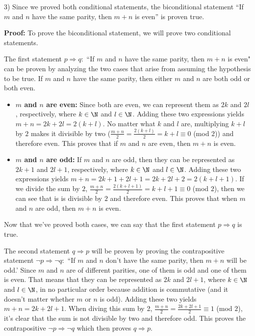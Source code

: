 \begin{paragraph}{3)}
		\leftIndent Since we proved both conditional statements, the 
		biconditional statement ``If $m$ and $n$ have the same parity,
		then $m + n$ is even'' is proven true. \spacing

		\textbf{Proof:} To prove the biconditional statement, we will prove two conditional statements.\spacing

		\leftIndent The first statement $p \Rightarrow q:$ ``If $m$ and $n$ have the same parity, then $m + n$ is even"
		can be proven by analyzing the two cases that arise from assuming the hypothesis to be true. 
		If $m$ and $n$ have the same parity, then either $m$ and $n$ are both odd or both even. \

		\begin{itemize}
			\item{
				\textbf{$\mathbf{\textit{m}}$ and $\mathbf{\textit{n}}$ are even:} Since both are even, we can represent them as 
				$2k$ and $2l$, respectively, where $k \in \N$ and $l \in \N$. Adding these two
				expressions yields $m + n = 2k + 2l = 2(k+l)$. No matter what $k$ and $l$ are, 
				multiplying $k + l$ by $2$ makes it divisible by two 
				($\frac{m + n}{2} = \frac{2(k + l)}{2} = k + l \equiv 0$ (mod $2$)) and therefore even. 
				This proves that if $m$ and $n$ are even, then $m + n$ is even.
			}
		
			\item{
				\textbf{$\mathbf{\textit{m}}$ and $\mathbf{\textit{n}}$ are odd:} If $m$ and
				$n$ are odd, then they can be represented as $2k + 1$ and $2l + 1$, respectively,
				where $k \in \N$ and $l \in \N$. Adding these two expressions yields 
				$m + n = 2k + 1 + 2l + 1 = 2k + 2l + 2 = 2(k + l + 1)$. If we divide the sum by $2$,
				$\frac{m + n}{2} = \frac{2(k + l + 1)}{2} = k + l + 1 \equiv 0$ (mod $2$), then we can see that is is divisible
				by $2$ and therefore even. This proves that when  $m$ and $n$ are odd, then $m + n$ is even.
			}
		\end{itemize}

		\begin{flushleft}
			Now that we've proved both cases, we can say that the first statement $p \Rightarrow q$ is true.
		\end{flushleft}

		\leftIndent The second statement $q \Rightarrow p$ will be proven by proving the contrapositive statement
		$\neg p \Rightarrow \neg q:$ ``If $m$ and $n$ don't have the same parity, then $m + n$ will be odd.'
		Since $m$ and $n$ are of different parities, one of them is odd and one of them is even. That means that 
		they can be represented as $2k$ and $2l + 1$, where $k \in \N$ and $l \in \N$, in no particular order because 
		addition is commutative (and it doesn't matter whether $m$ or $n$ is odd). Adding these two yields
		$m + n = 2k + 2l + 1$. When diving this sum by 2, $\frac{m + n}{2} = \frac{2k + 2l + 1}{2} \equiv 1$ (mod $2$),
		it's clear that the sum is not divisible by two and therefore odd. This proves the contrapositive $\neg p \Rightarrow \neg q$
		which then proves $q \Rightarrow p$. \spacing
		

\end{paragraph}
